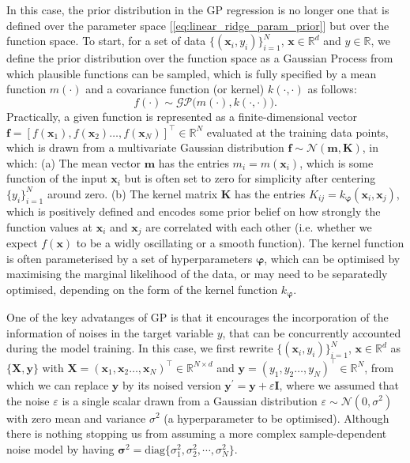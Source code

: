 In this case, the prior distribution in the GP regression is no longer one that is defined over the parameter space [\cref{eq:linear_ridge_param_prior}] but over the function space. To start, for a set of data $\{(\bm{x}_i,y_i)\}_{i=1}^N$, $\bm{x}\in\mathbb{R}^d$ and $y\in\mathbb{R}$, we define the prior distribution over the function space as a Gaussian Process from which plausible functions can be sampled, which is fully specified by a mean function $m(\cdot)$ and a covariance function (or kernel) $k(\cdot,\cdot)$ as follows:
\begin{equation}
    \label{eq:GP_function_prior}
    f(\cdot)\sim\mathcal{GP}\big(m(\cdot),k(\cdot,\cdot) \big).
\end{equation}
Practically, a given function is represented as a finite-dimensional vector $\bm{f}=[f(\bm{x}_1),f(\bm{x}_2)\ldots,f(\bm{x}_N)]^\top\in\mathbb{R}^N$ evaluated at the training data points, which is drawn from a multivariate Gaussian distribution $\bm{f}\sim\mathcal{N}(\bm{m},\bm{K})$, in which: (a) The mean vector $\bm{m}$ has the entries $m_i=m(\bm{x}_i)$, which is some function of the input $\bm{x}_i$ but is often set to zero for simplicity after centering $\{y_i\}_{i=1}^N$ around zero. (b) The kernel matrix $\bm{K}$ has the entries $K_{ij}=k_{\boldsymbol{\varphi}}(\bm{x}_i,\bm{x}_j)$, which is positively defined and encodes some prior belief on how strongly the function values at $\bm{x}_i$ and $\bm{x}_j$ are correlated with each other (i.e. whether we expect $f(\bm{x})$ to be a widly oscillating or a smooth function). The kernel function is often parameterised by a set of hyperparameters $\boldsymbol{\varphi}$, which can be optimised by maximising the marginal likelihood of the data, or may need to be separatedly optimised, depending on the form of the kernel function $k_{\boldsymbol{\varphi}}$.

One of the key advatanges of GP is that it encourages the incorporation of the information of noises in the target variable $y$, that can be concurrently accounted during the model training. In this case, we first rewrite $\{(\bm{x}_i,y_i)\}_{i=1}^N$, $\bm{x}\in\mathbb{R}^d$ as $\{\bm{X},\bm{y}\}$ with $\bm{X}=(\bm{x}_1,\bm{x}_2\ldots,\bm{x}_N)^\top\in\mathbb{R}^{N\times d}$ and $\bm{y}=(y_1,y_2\ldots,y_N)^\top\in\mathbb{R}^N$, from which we can replace $\bm{y}$ by its noised version $\bm{y}^\prime=\bm{y}+\varepsilon\bm{I}$, where we assumed that the noise $\varepsilon$ is a single scalar drawn from a Gaussian distribution $\varepsilon\sim\mathcal{N}(0,\sigma^2)$ with zero mean and variance $\sigma^2$ (a hyperparameter to be optimised). Although there is nothing stopping us from assuming a more complex sample-dependent noise model by having $\boldsymbol{\sigma}^2=\mathrm{diag}\{\sigma^2_1,\sigma^2_2,\cdots,\sigma^2_N\}$.

